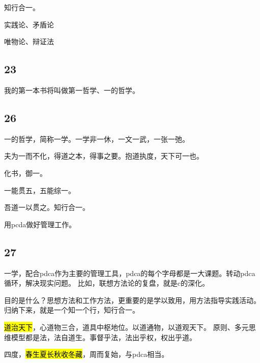 知行合一。

实践论、矛盾论

唯物论、辩证法

\subsection{23}

我的第一本书将叫做第一哲学、一的哲学。

\subsection{26}

一的哲学，简称一学。一学非一休，一文一武，一张一弛。

夫为一而不化，得道之本，得事之要。抱道执度，天下可一也。

化书，御一。

一能贯五，五能综一。

吾道一以贯之。知行合一。

用pcda做好管理工作。

\subsection{27}

一学，配合pdca作为主要的管理工具，pdca的每个字母都是一大课题。转动pdca循环，解决现实问题。
比如，联想方法论的复盘，就是c的深化。

目的是什么？思想方法和工作方法，更重要的是学以致用，用方法指导实践活动。
归纳下来，就是一个知一个行，知行合一。

\hl{道治天下}，心道物三合，道具中枢地位。以道通物，以道观天下。
原则、多元思维模型都是法，法自道生。事督乎法，法出乎权，权出乎道。

四度，\hl{春生夏长秋收冬藏}，周而复始，与pdca相当。
